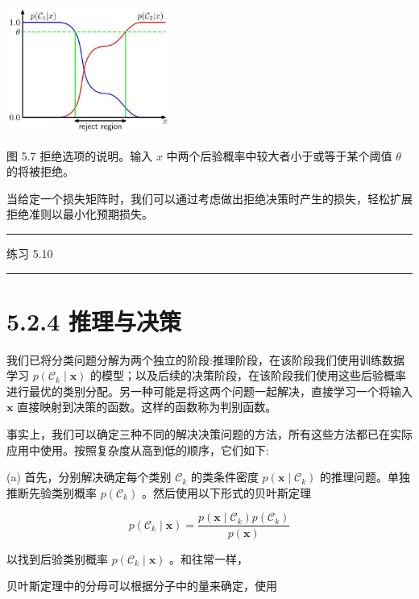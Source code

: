 \documentclass[10pt]{report}
\newcommand{\HRule}{\begin{center}\rule{0.9\linewidth}{0.2mm}\end{center}}
\begin{document}
\begin{center}
\includegraphics[max width=0.4\textwidth]{images/0194e279-9b28-703a-88f4-c3ac21e2010d_162_957_344_588_458_0.jpg}
\end{center}
\hspace*{3em} 

图 5.7 拒绝选项的说明。输入 \(x\) 中两个后验概率中较大者小于或等于某个阈值 \(\theta\) 的将被拒绝。

当给定一个损失矩阵时，我们可以通过考虑做出拒绝决策时产生的损失，轻松扩展拒绝准则以最小化预期损失。

\HRule

练习 5.10

\HRule

\section*{5.2.4 推理与决策}

我们已将分类问题分解为两个独立的阶段:推理阶段，在该阶段我们使用训练数据学习 \(p\left( {{\mathcal{C}}_{k} \mid  \mathbf{x}}\right)\) 的模型；以及后续的决策阶段，在该阶段我们使用这些后验概率进行最优的类别分配。另一种可能是将这两个问题一起解决，直接学习一个将输入 \(\mathbf{x}\) 直接映射到决策的函数。这样的函数称为判别函数。

事实上，我们可以确定三种不同的解决决策问题的方法，所有这些方法都已在实际应用中使用。按照复杂度从高到低的顺序，它们如下:

(a) 首先，分别解决确定每个类别 \({\mathcal{C}}_{k}\) 的类条件密度 \(p\left( {\mathbf{x} \mid  {\mathcal{C}}_{k}}\right)\) 的推理问题。单独推断先验类别概率 \(p\left( {\mathcal{C}}_{k}\right)\) 。然后使用以下形式的贝叶斯定理

\[
p\left( {{\mathcal{C}}_{k} \mid  \mathbf{x}}\right)  = \frac{p\left( {\mathbf{x} \mid  {\mathcal{C}}_{k}}\right) p\left( {\mathcal{C}}_{k}\right) }{p\left( \mathbf{x}\right) } \tag{5.24}
\]

以找到后验类别概率 \(p\left( {{\mathcal{C}}_{k} \mid  \mathbf{x}}\right)\) 。和往常一样，

贝叶斯定理中的分母可以根据分子中的量来确定，使用
\end{document}
